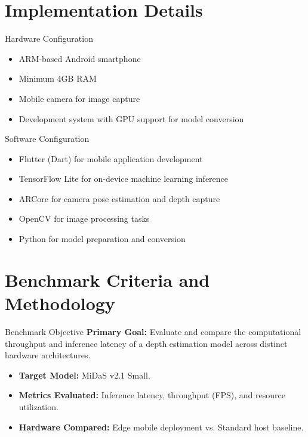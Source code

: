 \documentclass[11pt]{beamer}
\begin{document}
\section{Implementation Details}

\begin{frame}{Hardware Configuration}
\begin{itemize}
\item ARM-based Android smartphone
\item Minimum 4GB RAM
\item Mobile camera for image capture
\item Development system with GPU support for model conversion
\end{itemize}
\end{frame}

\begin{frame}{Software Configuration}
\begin{itemize}
\item Flutter (Dart) for mobile application development
\item TensorFlow Lite for on-device machine learning inference
\item ARCore for camera pose estimation and depth capture
\item OpenCV for image processing tasks
\item Python for model preparation and conversion
\end{itemize}
\end{frame}

\section{Benchmark Criteria and Methodology}

\begin{frame}{Benchmark Objective}
    \textbf{Primary Goal:} Evaluate and compare the computational throughput and inference latency of a depth estimation model across distinct hardware architectures.
    \vspace{0.5cm}
    \begin{itemize}
        \item \textbf{Target Model:} MiDaS v2.1 Small.
        \item \textbf{Metrics Evaluated:} Inference latency, throughput (FPS), and resource utilization.
        \item \textbf{Hardware Compared:} Edge mobile deployment vs. Standard host baseline.
    \end{itemize}
\end{frame}
\end{document}
